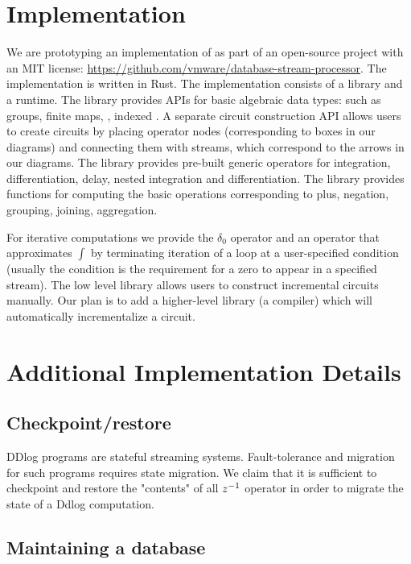 \section{Implementation}\label{sec:implementation}

We are prototyping an implementation of \dbsp as part of an
open-source project with an MIT license: 
\url{https://github.com/vmware/database-stream-processor}.
The implementation is written in Rust.
The implementation consists of a library and a runtime.
The library provides APIs for basic algebraic data types:
such as groups, finite maps, \zr, indexed \zr.  
A separate circuit construction API allows users to 
create \dbsp circuits by placing operator nodes (corresponding to boxes in our diagrams)
and connecting them with streams, which correspond to the
arrows in our diagrams.  The library provides pre-built generic operators
for integration, differentiation, delay, nested integration and differentiation.
The \zr library provides functions for computing the basic \zr operations
corresponding to plus, negation, grouping, joining, aggregation.

For iterative computations we provide the $\delta_0$ operator and
an operator that approximates $\int$ by terminating iteration of
a loop at a user-specified condition (usually the condition is the 
requirement for a zero to appear in a specified stream).
The low level library allows users to construct incremental
circuits manually.  Our plan is to add a higher-level library
(a compiler) which will automatically incrementalize a circuit.

\section{Additional Implementation Details}\label{sec:implementation-additional}

\subsection{Checkpoint/restore}

DDlog programs are stateful streaming systems.  Fault-tolerance and 
migration for such programs requires state migration.  We claim that it is 
sufficient to checkpoint and restore the "contents" of all $z^{-1}$ operator
in order to migrate the state of a Ddlog computation.

\subsection{Maintaining a database}

